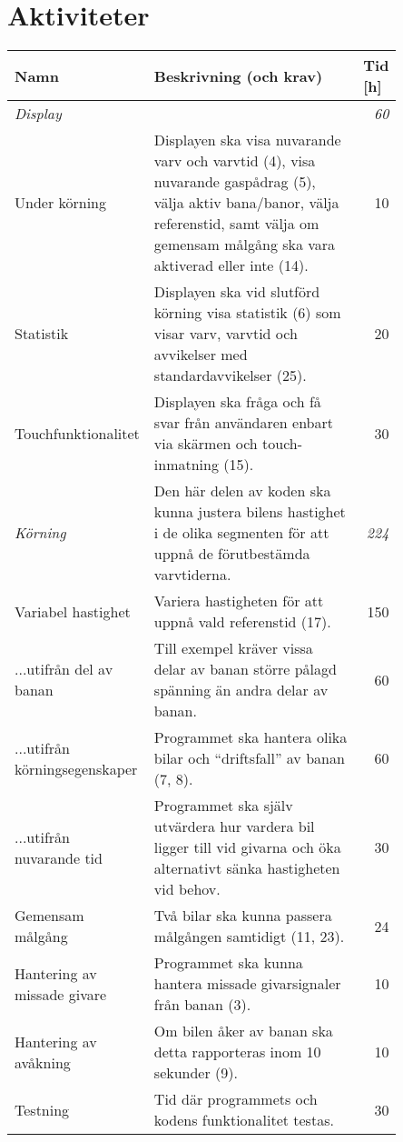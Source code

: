 \documentclass[10pt,swedish,oneside]{lips-no_customer}
\begin{document}
	\section{Aktiviteter}
	\begin{tabular}{| p{0.3\linewidth} | p{0.55\linewidth}| r |}
		\multicolumn{1}{l}{\bfseries Namn} & \multicolumn{1}{l}{\textbf{Beskrivning} (och \textbf{krav})} & \multicolumn{1}{l}{\textbf{Tid} [h]} \\\hline
		\emph{Display} && \emph{60} \\\hline
		\quad Under körning & Displayen ska visa nuvarande varv och varvtid (4), visa nuvarande gaspådrag (5), välja aktiv bana/banor, välja referenstid, samt välja om gemensam målgång ska vara aktiverad eller inte (14). & 10 \\\hline
		\quad Statistik & Displayen ska vid slutförd körning visa statistik (6) som visar varv, varvtid och avvikelser med standardavvikelser (25). & 20 \\\hline
		\quad Touchfunktionalitet & Displayen ska fråga och få svar från användaren enbart via skärmen och touch-inmatning (15). & 30 \\\hline

		\emph{Körning} & Den här delen av koden ska kunna justera bilens hastighet i de olika segmenten för att uppnå de förutbestämda varvtiderna.  & \emph{224} \\\hline
		\quad Variabel hastighet & Variera hastigheten för att uppnå vald referenstid (17). & 150 \\\hline
		\quad\quad ...utifrån del av banan & Till exempel kräver vissa delar av banan större pålagd spänning än andra delar av banan. & 60 \\\hline
		\quad\quad ...utifrån körningsegenskaper & Programmet ska hantera olika bilar och ``driftsfall'' av banan (7, 8). & 60 \\\hline
		\quad\quad ...utifrån nuvarande tid & Programmet ska själv utvärdera hur vardera bil ligger till vid givarna och öka alternativt sänka hastigheten vid behov. & 30 \\\hline
		\quad Gemensam målgång & Två bilar ska kunna passera målgången samtidigt (11, 23). & 24 \\\hline
		\quad Hantering av missade givare & Programmet ska kunna hantera missade givarsignaler från banan (3). & 10 \\\hline
		\quad Hantering av avåkning & Om bilen åker av banan ska detta rapporteras inom 10 sekunder (9). & 10 \\\hline
		\quad Testning & Tid där programmets och kodens funktionalitet testas. & 30 \\\hline


\end{tabular}
\end{document}
